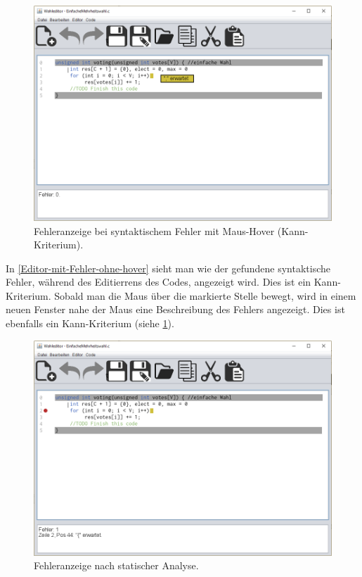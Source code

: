 \documentclass[a4paper]{scrreprt}
\begin{document}
\begin{figure}[H]
\includegraphics[scale=0.4]{Editor-mit-Fehler-mit-hover.png}
\caption{Fehleranzeige bei syntaktischem Fehler mit Maus-Hover (Kann-Kriterium).}
\label{Editor-mit-Fehler-mit-hover}
\end{figure}

In \ref{Editor-mit-Fehler-ohne-hover} sieht man wie der gefundene syntaktische Fehler, während des Editierrens des Codes, angezeigt wird. Dies ist ein Kann-Kriterium. Sobald man die Maus über die markierte Stelle bewegt, wird in einem neuen Fenster nahe der Maus eine Beschreibung des Fehlers angezeigt. Dies ist ebenfalls ein Kann-Kriterium (siehe \ref{Editor-mit-Fehler-mit-hover}).

\begin{figure}[H]
\includegraphics[scale=0.4]{Editor-mit-Fehler-nach-statischer-analyse.png}
\caption{Fehleranzeige nach statischer Analyse.}
\label{Editor-mit-Fehler-nach-statischer-analyse}
\end{figure}
\end{document}
